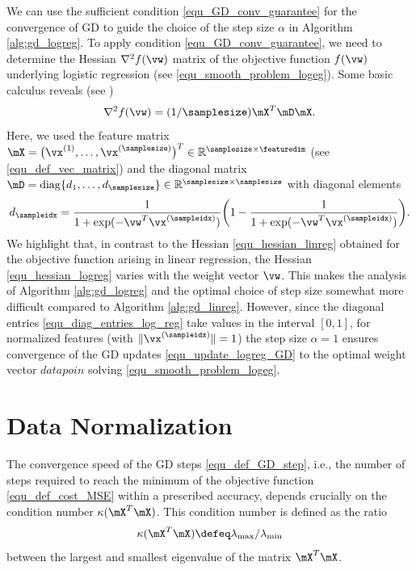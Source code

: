 \documentclass[12pt]{report}
\begin{document}
We can use the sufficient condition \eqref{equ_GD_conv_guarantee} for the convergence of GD 
to guide the choice of the step size $\alpha$ in Algorithm \ref{alg:gd_logreg}. To apply condition 
\eqref{equ_GD_conv_guarantee}, we need to determine the Hessian $\nabla^{2} f(\vw)$ matrix of the 
objective function $f(\vw)$ underlying logistic regression (see \eqref{equ_smooth_problem_logeg}). 
Some basic calculus reveals (see \cite[Ch. 4.4.]{hastie01statisticallearning})
\begin{equation}
\label{equ_hessian_logreg}
\nabla^{2} f(\vw) =  (1/\samplesize) \mX^{T} \mD \mX. 
\end{equation}
Here, we used the feature matrix $\mX=\big(\vx^{(1)},\ldots,\vx^{(\samplesize)}\big)^{T} \in \mathbb{R}^{\samplesize \times \featuredim}$ (see \eqref{equ_def_vec_matrix}) 
and the diagonal matrix $\mD = {\rm diag} \{d_{1},\ldots,d_{\samplesize}\} \in \mathbb{R}^{\samplesize \times \samplesize}$ with diagonal elements 
\begin{equation}
d_{\sampleidx} = \frac{1}{1+\exp(-\vw^{T} \vx^{(\sampleidx)})} \bigg(1- \frac{1}{1+\exp(-\vw^{T} \vx^{(\sampleidx)})}  \bigg). \label{equ_diag_entries_log_reg}   %
\end{equation} 
We highlight that, in contrast to the Hessian \eqref{equ_hessian_linreg} obtained for the objective function 
arising in linear regression, the Hessian \eqref{equ_hessian_logreg} varies with the weight vector $\vw$. 
This makes the analysis of Algorithm \ref{alg:gd_logreg} and the optimal choice of step size somewhat 
more difficult compared to Algorithm \ref{alg:gd_linreg}. However, since the diagonal entries \eqref{equ_diag_entries_log_reg} 
take values in the interval $[0,1]$, for normalized features (with $\| \vx^{(\sampleidx)} \|=1$) the step size $\alpha=1$ 
ensures convergence of the GD updates \eqref{equ_update_logreg_GD} to the optimal weight vector 
$datapoin$ solving \eqref{equ_smooth_problem_logeg}. 

\section{Data Normalization} 

The convergence speed of the GD steps \eqref{equ_def_GD_step}, i.e., the 
number of steps required to reach the minimum of the objective function 
\eqref{equ_def_cost_MSE} within a prescribed accuracy, depends crucially 
on the condition number $\kappa( \mX^{T} \mX)$. This condition number is 
defined as the ratio 
\begin{equation}
\label{equ_def_condition_number} 
\kappa( \mX^{T} \mX) \defeq \lambda_{\rm max}/\lambda_{\rm min}
\end{equation} 
between the largest and smallest eigenvalue of the matrix $\mX^{T} \mX$. 
\end{document}

